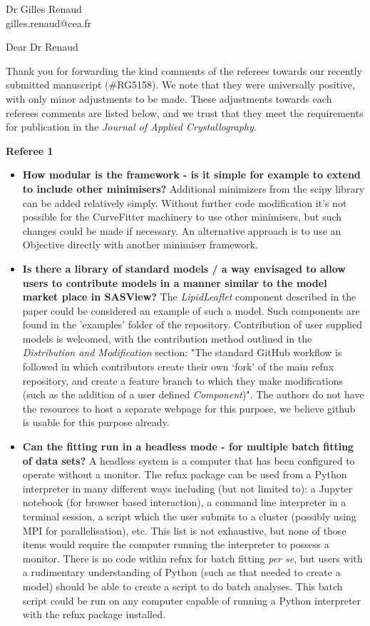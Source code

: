 \documentclass[fontsize=12pt, paper=a4]{scrlttr2}
\begin{document}
\begin{letter}{Dr Gilles Renaud \\ gilles.renaud@cea.fr}

\opening{Dear Dr Renaud}  %
Thank you for forwarding the kind comments of the referees towards our recently submitted manuscript (\#RG5158). We note that they were universally positive, with only minor adjustments to be made. These adjustments towards each referees comments are listed below, and we trust that they meet the requirements for publication in the \emph{Journal of Applied Crystallography}.

\vskip12pt
\noindent
\textbf{Referee 1}
\begin{itemize}
\item \textbf{How modular is the framework - is it simple for example to extend to include other minimisers?} Additional minimizers from the scipy library can be added relatively simply. Without further code modification it's not possible for the CurveFitter machinery to use other minimisers, but such changes could be made if necessary. An alternative approach is to use an Objective directly with another minimiser framework.
\item \textbf{Is there a library of standard models / a way envisaged to allow users to contribute models in a manner similar to the model market place in SASView?} The \emph{LipidLeaflet} component described in the paper could be considered an example of such a model. Such components are found in the 'examples' folder of the repository. Contribution of user supplied models is welcomed, with the contribution method outlined in the \emph{Distribution and Modification} section: "The standard GitHub workflow is followed in which contributors create their own `fork' of the main refnx repository, and create a feature branch to which they make modifications (such as the addition of a user defined \emph{Component})". The authors do not have the resources to host a separate webpage for this purpose, we believe github is usable for this purpose already.
\item \textbf{Can the fitting run in a headless mode - for multiple batch fitting of data sets?} A headless system is a computer that has been configured to operate without a monitor. The refnx package can be used from a Python interpreter in many different ways including (but not limited to): a Jupyter notebook (for browser based interaction), a command line interpreter in a terminal session, a script which the user submits to a cluster (possibly using MPI for parallelisation), etc. This list is not exhaustive, but none of those items would require the computer running the interpreter to possess a monitor. There is no code within refnx for batch fitting \emph{per se}, but users with a rudimentary understanding of Python (such as that needed to create a model) should be able to create a script to do batch analyses. This batch script could be run on any computer capable of running a Python interpreter with the refnx package installed.

\end{itemize}
\end{letter}
\end{document}
